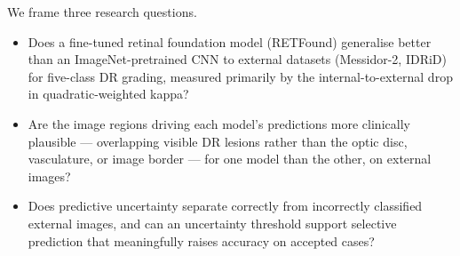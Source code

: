 \documentclass[journal]{IEEEtran}
\begin{document}
We frame three research questions.
\begin{itemize}
  \item[\textbf{RQ1 (Performance).}] Does a fine-tuned retinal foundation model
    (RETFound) generalise better than an ImageNet-pretrained CNN to external
    datasets (Messidor-2, IDRiD) for five-class DR grading, measured primarily by
    the internal-to-external drop in quadratic-weighted kappa?
  \item[\textbf{RQ2 (Explainability).}] Are the image regions driving each
    model's predictions more clinically plausible --- overlapping visible DR
    lesions rather than the optic disc, vasculature, or image border --- for one
    model than the other, on external images?
  \item[\textbf{RQ3 (Uncertainty).}] Does predictive uncertainty separate
    correctly from incorrectly classified external images, and can an uncertainty
    threshold support selective prediction that meaningfully raises accuracy on
    accepted cases?
\end{itemize}
\end{document}
